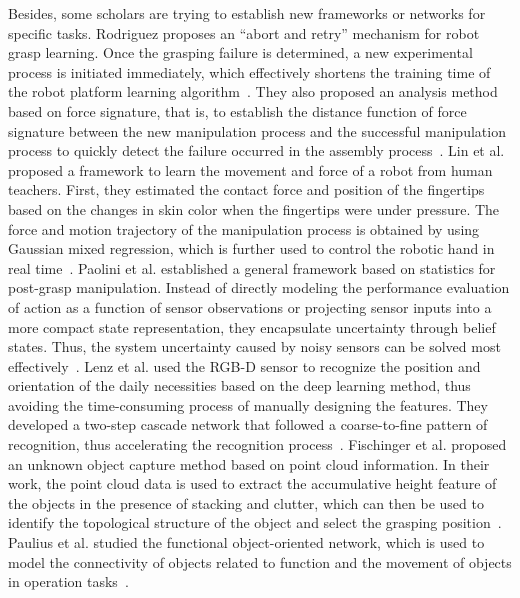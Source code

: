 \documentclass[journal,twoside,web]{ieeecolor}
\providecommand{\DIFadd}[1]{{\protect\color{blue}\uwave{#1}}} %
\providecommand{\DIFaddbegin}{} %
\providecommand{\DIFaddend}{} %
\newcommand{\DIFaddincludegraphics}[2][]{{\color{blue}\fbox{\DIFOincludegraphics[#1]{#2}}}} %
\DeclareRobustCommand{\DIFaddbegin}{\DIFOaddbegin \let\includegraphics\DIFaddincludegraphics} %
\DeclareRobustCommand{\DIFaddend}{\DIFOaddend \let\includegraphics\DIFOincludegraphics} %
\begin{document}
Besides, some scholars are trying to establish new frameworks or networks for specific tasks. 
Rodriguez proposes an “abort and retry” mechanism for robot grasp learning. Once the grasping failure is determined, a new experimental process is initiated immediately, which effectively shortens the training time of the robot platform learning algorithm~\cite{Rodriguez2011}. 
They also proposed an analysis method based on force signature, that is, to establish the distance function of \DIFaddbegin \DIFadd{the }\DIFaddend force signature between the new manipulation process and the successful manipulation process to quickly detect the failure occurred in the assembly process~\cite{Rodriguez2010}.
Lin et al. proposed a framework to learn the movement and force of a robot from human teachers. First, they estimated the contact force and position of the fingertips based on the changes in skin color when the fingertips were under pressure. The force and motion trajectory of the manipulation process is obtained by using Gaussian mixed regression, which is further used to control the robotic hand in real time~\cite{Lin2012}.
Paolini et al. established a general framework based on statistics for post-grasp manipulation. Instead of directly modeling the performance evaluation of action as a function of sensor observations or projecting sensor inputs into a more compact state representation, they encapsulate uncertainty through belief states. Thus, the system uncertainty caused by noisy sensors can be solved most effectively~\cite{Paolini2014}. 
Lenz et al. used the RGB-D sensor to recognize the position and orientation of the daily necessities based on the deep learning method, thus avoiding the time-consuming process of manually designing the features. They developed a two-step cascade network that followed a coarse-to-fine pattern of recognition, thus accelerating the recognition process~\cite{Lenz2015}.
Fischinger et al. proposed an unknown object capture method based on point cloud information. In their work, the point cloud data is used to extract the accumulative height feature of the objects in the presence of stacking and clutter, which can then be used to identify the topological structure of the object and select the grasping position~\cite{Fischinger2015}. 
Paulius et al. studied the functional object-oriented network, which is used to model the connectivity of objects related to function and the movement of objects in operation tasks~\cite{Paulius2016}. 
\end{document}

